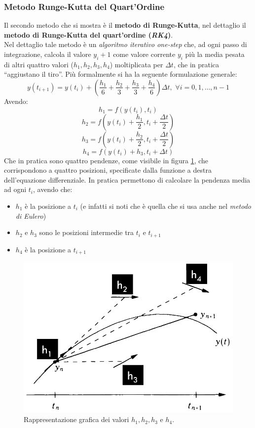 \documentclass[a4paper,12pt, oneside]{book}
\begin{document}
\subsubsection{Metodo Runge-Kutta del Quart'Ordine}
Il secondo metodo che si mostra è il \textbf{metodo di Runge-Kutta}, nel
dettaglio il \textbf{metodo di Runge-Kutta del quart'ordine (\textit{RK4})}.\\
Nel dettaglio tale metodo è un \textit{algoritmo iterativo one-step} che, ad
ogni passo di integrazione, calcola il valore $y_i+1$ come valore corrente $y_i$
più la media pesata di altri quattro valori ($h_1, h_2, h_3, h_4$) moltiplicata
per $\Delta t$, che in pratica ``aggiustano il tiro''. Più formalmente si ha la
seguente formulazione generale:
\[y(t_{i+1})=y(t_i)+\left(\frac{h_1}{6}+\frac{h_2}{3}+\frac{h_3}{3}+
    \frac{h_4}{6}\right) \Delta t,\,\,\forall i = 0,1,\ldots, n-1\]   
Avendo:
\[h_1=f(y(t_i),t_i)\]
\[h_2=f\left(y(t_i)+\frac{h_1}{2},t_i+\frac{\Delta t}{2}\right)\]
\[h_3=f\left(y(t_i)+\frac{h_2}{2},t_i+\frac{\Delta t}{2}\right)\]
\[h_4=f(y(t_i)+h_3,t_i+\Delta t)\]
Che in pratica sono quattro pendenze, come visibile in figura \ref{fig:rk4}, che
corrispondono a quattro posizioni, 
specificate dalla funzione a destra dell'equazione differenziale. In pratica
permettono di calcolare la pendenza media ad ogni $t_i$, avendo che:
\begin{itemize}
  \item $h_1$ è la posizione a $t_i$ (e infatti si noti che è quella che si usa
  anche nel \textit{metodo di Eulero})
  \item $h_2$ e $h_3$ sono le posizioni intermedie tra $t_i$ e $t_{i+1}$
  \item $h_4$ è la posizione a $t_{i+1}$ 
\end{itemize}
\begin{figure}
  \centering
  \includegraphics[scale = 1]{img/rk4.jpg}
  \caption{Rappresentazione grafica dei valori $h_1, h_2, h_3$ e $h_4$.} 
  \label{fig:rk4}
\end{figure}
\end{document}
